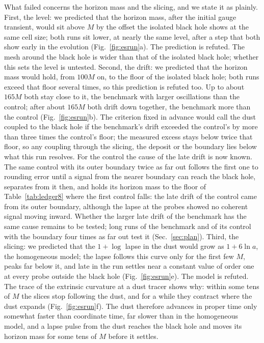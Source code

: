 \documentclass[aps,prd,twocolumn,10pt,superscriptaddress,nofootinbib,longbibliography,floatfix]{revtex4-2}
\begin{document}
What failed concerns the horizon mass and the slicing, and we state it as plainly. First, the level: we predicted that the horizon mass, after the initial gauge transient, would sit above $M$ by the offset the isolated black hole shows at the same cell size; both runs sit lower, at nearly the same level, after a step that both show early in the evolution (Fig.~\ref{fig:esrun}a). The prediction is refuted. The mesh around the black hole is wider than that of the isolated black hole; whether this sets the level is untested. Second, the drift: we predicted that the horizon mass would hold, from $100M$ on, to the floor of the isolated black hole; both runs exceed that floor several times, so this prediction is refuted too. Up to about $165M$ both stay close to it, the benchmark with larger oscillations than the control; after about $165M$ both drift down together, the benchmark more than the control (Fig.~\ref{fig:esrun}b). The criterion fixed in advance would call the dust coupled to the black hole if the benchmark's drift exceeded the control's by more than three times the control's floor; the measured excess stays below twice that floor, so any coupling through the slicing, the deposit or the boundary lies below what this run resolves. For the control the cause of the late drift is now known. The same control with its outer boundary twice as far out follows the first one to rounding error until a signal from the nearer boundary can reach the black hole, separates from it then, and holds its horizon mass to the floor of Table~\ref{tab:ledger8} where the first control falls: the late drift of the control came from its outer boundary, although the lapse at the probes showed no coherent signal moving inward. Whether the larger late drift of the benchmark has the same cause remains to be tested; long runs of the benchmark and of its control with the boundary four times as far out test it (Sec.~\ref{sec:plan}). Third, the slicing: we predicted that the $1+\log$ lapse in the dust would grow as $1+6\ln a$, the homogeneous model; the lapse follows this curve only for the first few $M$, peaks far below it, and late in the run settles near a constant value of order one at every probe outside the black hole (Fig.~\ref{fig:esrun}e). The model is refuted. The trace of the extrinsic curvature at a dust tracer shows why: within some tens of $M$ the slices stop following the dust, and for a while they contract where the dust expands (Fig.~\ref{fig:esrun}f). The dust therefore advances in proper time only somewhat faster than coordinate time, far slower than in the homogeneous model, and a lapse pulse from the dust reaches the black hole and moves its horizon mass for some tens of $M$ before it settles.
\end{document}

